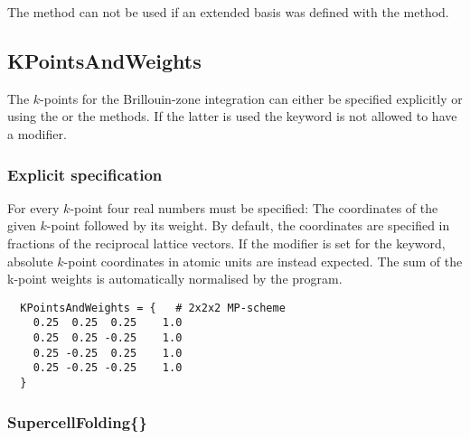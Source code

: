 The  method can not be used if an extended basis
was defined with the  method.


\subsection{KPointsAndWeights}
\label{sec:dftbp.KPointsAndWeights}

The $k$-points for the Brillouin-zone integration can either be
specified explicitly or using the  or the
 methods. If the latter is used the
 keyword is not allowed to have a modifier.

\subsubsection{Explicit specification}

For every $k$-point four real numbers must be specified: The
coordinates of the given $k$-point followed by its weight. By default,
the coordinates are specified in fractions of the reciprocal lattice
vectors. If the modifier  is set for the
 keyword, absolute $k$-point coordinates in
atomic units are instead expected.  The sum of the k-point weights is
automatically normalised by the program.
\begin{verbatim}
  KPointsAndWeights = {   # 2x2x2 MP-scheme
    0.25  0.25  0.25    1.0
    0.25  0.25 -0.25    1.0
    0.25 -0.25  0.25    1.0
    0.25 -0.25 -0.25    1.0
  }
\end{verbatim}

\subsubsection{SupercellFolding\{\}}
\label{sec:dftbp.SupercellFolding}

